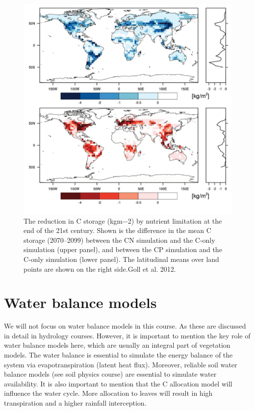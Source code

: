 \documentclass[12pt,oneside]{book}
\begin{document}
\begin{figure}

{\centering \includegraphics[width=0.8\linewidth]{figures/chap5/f524_gool_sink_map} 

}

\caption{The reduction in C storage (kgm−2) by nutrient limitation at the end of the 21st century. Shown is the difference in the mean C storage (2070–2099) between the CN simulation and the C-only simulation (upper panel), and between the CP simulation and the C-only simulation (lower panel). The latitudinal means over land points are shown on the right side.Goll et al. 2012.}\label{fig:f524}
\end{figure}

\section{Water balance models}\label{water-balance-models}

We will not focus on water balance models in this course. As these are
discussed in detail in hydrology courses. However, it is important to
mention the key role of water balance models here, which are usually an
integral part of vegetation models. The water balance is essential to
simulate the energy balance of the system via evapotranspiration (latent
heat flux). Moreover, reliable soil water balance models (see soil
physics course) are essential to simulate water availability. It is also
important to mention that the C allocation model will influence the
water cycle. More allocation to leaves will result in high transpiration
and a higher rainfall interception.
\end{document}
